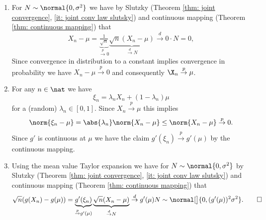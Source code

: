 \begin{solution}
    \begin{enumerate}[wide=0pt]
        \item[\ref{it: (delta-method) X_n to mu}] For \(N\sim \normal{0,\sigma^2}\) we have 
        by Slutzky (Theorem \ref{thm: joint convergence}, \ref{it: joint conv law slutsky})
        and continuous mapping (Theorem \ref{thm: continuous mapping}) that
        \[
            X_n -\mu
            = \underbrace{\tfrac1{\sqrt{n}}}_{\overset{p}\to 0}
            \underbrace{\sqrt{n}(X_n - \mu)}_{\overset{d}\to N}
            \overset{d}\to 0 \cdot N = 0,
        \]
        Since convergence in distribution to a constant implies convergence in probability
        we have \(X_n - \mu\overset{p}\to 0\) and consequently \(\X_n \overset{p}\to \mu\).

        \item[\ref{it: (delta-method) taylor expansion}] For any \(n\in \nat\) we
        have
        \[
            \xi_n = \lambda_n X_n + (1-\lambda_n)\mu
        \]
        for a (random) \(\lambda_n \in [0,1]\). Since \(X_n \overset{p}\to
        \mu\) this implies 
        \[
            \norm{\xi_n - \mu}
            = \abs{\lambda_n} \norm{X_n - \mu}
            \le \norm{X_n - \mu}
            \overset{p}\to 0.
        \]
        Since \(g'\) is continuous at \(\mu\) we have the claim \(g'(\xi_n)
        \overset{p}\to g'(\mu)\) by the continuous mapping.
        
        \item[\ref{it: (delta-method) proof}] Using the mean value Taylor
        expansion we have for \(N\sim \normal{0, \sigma^2}\)
        by Slutzky (Theorem \ref{thm: joint convergence}, \ref{it: joint conv law slutsky})
        and continuous mapping (Theorem \ref{thm: continuous mapping}) that
        \[
            \sqrt{n}(g(X_n) - g(\mu))
            = \underbrace{g'(\xi_n)}_{\overset{p}\to g'(\mu)} \underbrace{\sqrt{n}(X_n - \mu)}_{\overset{d}\to N}
            \overset{d}\to g'(\mu) N \sim \normal[\big]{0, (g'(\mu))^2\sigma^2}. 
            \qedhere
        \]
    \end{enumerate}
\end{solution}

